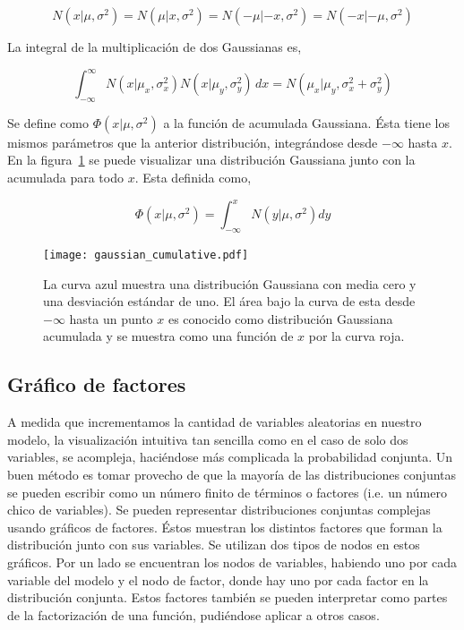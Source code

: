 \documentclass[11pt,twoside, spanish]{report} %
\begin{document}

\begin{equation}\label{eq:simetria}
N(x|\mu,\sigma^2) = N(\mu|x,\sigma^2) = N(-\mu|-x,\sigma^2) = N(-x|-\mu,\sigma^2)
\end{equation}

La integral de la multiplicaci\'on de dos Gaussianas es,

\begin{equation}\label{eq:multiplicacion_normales}
\int_{-\infty}^{\infty} N(x|\mu_x,\sigma_x^2)N(x|\mu_y,\sigma_y^2) \, dx = N(\mu_x|\mu_y,\sigma_x^2+\sigma_y^2)
\end{equation}

Se define como $\Phi(x|\mu,\sigma^2)$ a la funci\'on de acumulada Gaussiana.
\'Esta tiene los mismos par\'ametros que la anterior distribuci\'on, integr\'andose desde $-\infty$ hasta $x$.
En la figura~\ref{fig:acumulativa} se puede visualizar una distribuci\'on Gaussiana junto con la acumulada para todo $x$.
Esta definida como,


\begin{equation}\label{eq:phi_norm}
 \Phi(x|\mu,\sigma^2) = \int_{-\infty}^{x}N(y|\mu,\sigma^2)dy
\end{equation}


\begin{figure}[H]
	\centering
	\texttt{[image: gaussian\_cumulative.pdf]}
	\caption{La curva azul muestra una distribuci\'on Gaussiana con media cero y una desviaci\'on est\'andar de uno. El \'area bajo la curva de esta desde $-\infty$ hasta un punto $x$ es conocido como distribuci\'on Gaussiana acumulada y se muestra como una funci\'on de $x$ por la curva roja.}
	\label{fig:acumulativa}
\end{figure}



\subsection{Gr\'afico de factores}


A medida que incrementamos la cantidad de variables aleatorias en nuestro modelo, la visualizaci\'on intuitiva tan sencilla como en el caso de solo dos variables, se acompleja, haci\'endose m\'as complicada la probabilidad conjunta.
Un buen m\'etodo es tomar provecho  de que la mayor\'ia de las distribuciones conjuntas se pueden escribir como un n\'umero finito de t\'erminos o factores (i.e. un n\'umero chico de variables).
Se pueden representar distribuciones conjuntas complejas usando gr\'aficos de factores.
\'Estos muestran los distintos factores que forman la distribuci\'on junto con sus variables.
Se utilizan dos tipos de nodos en estos gr\'aficos.
Por un lado se encuentran los nodos de variables, habiendo uno por cada variable del modelo y el nodo de factor, donde hay uno por cada factor en la distribuci\'on conjunta.
Estos factores tambi\'en se pueden interpretar como partes de la factorizaci\'on de una funci\'on, pudi\'endose aplicar a otros casos.
\end{document}
